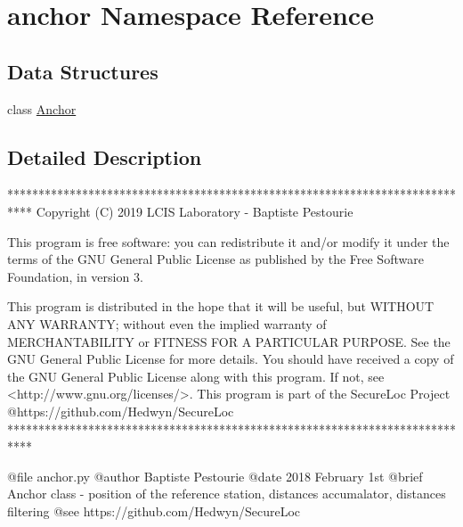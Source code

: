 \hypertarget{namespaceanchor}{}\section{anchor Namespace Reference}
\label{namespaceanchor}
\subsection*{Data Structures}
\begin{DoxyCompactItemize}
\item 
class \mbox{\hyperlink{classanchor_1_1_anchor}{Anchor}}
\end{DoxyCompactItemize}


\subsection{Detailed Description}
\begin{DoxyVerb}****************************************************************************
Copyright (C) 2019 LCIS Laboratory - Baptiste Pestourie

This program is free software: you can redistribute it and/or modify
it under the terms of the GNU General Public License as published by
the Free Software Foundation, in version 3.

This program is distributed in the hope that it will be useful,
but WITHOUT ANY WARRANTY; without even the implied warranty of
MERCHANTABILITY or FITNESS FOR A PARTICULAR PURPOSE. See the
GNU General Public License for more details.
You should have received a copy of the GNU General Public License
along with this program. If not, see <http://www.gnu.org/licenses/>.
This program is part of the SecureLoc Project @https://github.com/Hedwyn/SecureLoc
 ****************************************************************************

@file anchor.py
@author Baptiste Pestourie
@date 2018 February 1st
@brief Anchor class - position of the reference station, distances accumalator, distances filtering
@see https://github.com/Hedwyn/SecureLoc
\end{DoxyVerb}
 
